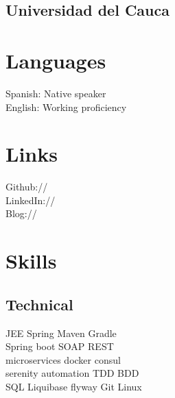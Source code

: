 \documentclass[]{deedy-resume-openfont}
\begin{document}
\begin{minipage}[t]{0.33\textwidth}
\subsection{Universidad del Cauca}
\sectionsep



\section{Languages} 
Spanish: Native speaker \\
English: Working proficiency \\
\sectionsep


\section{Links} 
Github:// \href{https://github.com/diegof00}{} \\
LinkedIn://  \href{https://www.linkedin.com/in/diegofreyes/}{} \\
Blog:// \href{https://diegof00.github.io}{} \\
\sectionsep


\section{Skills}
\subsection{Technical}
JEE \textbullet{} Spring \textbullet{} Maven \textbullet{} Gradle \\
Spring boot \textbullet{} SOAP \textbullet{} REST \\ 
microservices \textbullet{} docker \textbullet{} consul \\
serenity automation \textbullet{} TDD \textbullet{} BDD \\
SQL \textbullet{} Liquibase \textbullet{} flyway
Git \textbullet{} Linux  \\
\sectionsep


\end{minipage}
\end{document}
